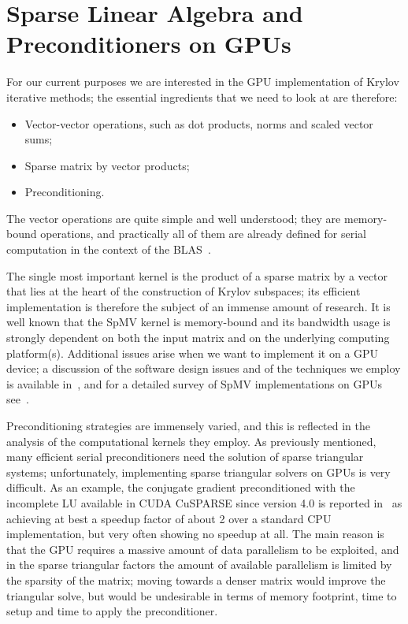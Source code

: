 \section{Sparse Linear Algebra and Preconditioners on GPUs\label{SLA-GPU}}

For our current purposes we are interested in the GPU implementation
of Krylov iterative methods; the essential ingredients that we need to 
look at are therefore:
\begin{itemize}
\item Vector-vector operations, such as dot products, norms and scaled
  vector sums;
\item Sparse matrix by vector products;
\item Preconditioning.
\end{itemize}
The vector operations are quite simple and well understood; they are
memory-bound operations, and practically all  of them are already
defined for serial computation in the context of the
BLAS~\cite{BLAS1,BLAS3}.  

The single most important kernel is the product of a sparse matrix by
a vector that lies at the heart of the construction of Krylov
subspaces; its efficient implementation is therefore the subject of an
immense amount of research. It is well known that the SpMV kernel is
memory-bound and  its bandwidth usage  is strongly dependent on both
the input matrix and on the underlying computing
platform(s). Additional issues arise when we want to implement it on a
GPU device; a discussion of the software design issues and of the
techniques we employ is available in~\cite{CaFiRo:2014,PSBLAS3}, and
for a detailed survey of SpMV implementations on GPUs 
see~\cite{Filippone:2017:SMM:3034774.3017994}. 

Preconditioning strategies are immensely varied, and this is reflected
in the analysis of the computational kernels they employ. 
As previously mentioned, many efficient serial preconditioners need the
solution of sparse triangular systems; unfortunately, implementing
sparse triangular solvers   on GPUs is very difficult.
As an example, the conjugate gradient preconditioned with the incomplete
LU available in CUDA CuSPARSE since version 4.0 
is reported in~\cite{Naumov11} as achieving at best a speedup factor
of about 2 over a standard CPU implementation, but very often showing
no speedup at all. The main reason is that the GPU requires a massive
amount of data parallelism to be exploited,  and in the sparse
triangular factors the amount of available parallelism is limited by
the sparsity of the matrix; moving towards a denser matrix would
improve the triangular solve, but would be  undesirable in terms of
memory footprint, time to setup and time to apply the preconditioner.    

